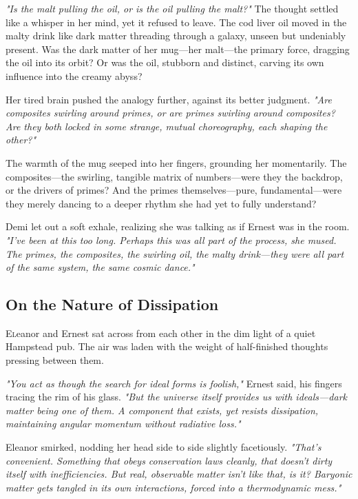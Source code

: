 \textit{"Is the malt pulling the oil, or is the oil pulling the malt?"} The thought settled like a whisper in her mind, yet it refused to leave. The cod liver oil moved in the malty drink like dark matter threading through a galaxy, unseen but undeniably present. Was the dark matter of her mug—her malt—the primary force, dragging the oil into its orbit? Or was the oil, stubborn and distinct, carving its own influence into the creamy abyss?

Her tired brain pushed the analogy further, against its better judgment. \textit{"Are composites swirling around primes, or are primes swirling around composites? Are they both locked in some strange, mutual choreography, each shaping the other?"}

The warmth of the mug seeped into her fingers, grounding her momentarily. The composites—the swirling, tangible matrix of numbers—were they the backdrop, or the drivers of primes? And the primes themselves—pure, fundamental—were they merely dancing to a deeper rhythm she had yet to fully understand?

Demi let out a soft exhale, realizing she was talking as if Ernest was in the room. \textit{"I’ve been at this too long.
Perhaps this was all part of the process, she mused. The primes, the composites, the swirling oil, the malty drink—they were all part of the same system, the same cosmic dance."}

\newpage
\subsection*{On the Nature of Dissipation}

\lettrine{E}leanor and Ernest sat across from each other in the dim light of a quiet Hampstead pub. The air was laden with the weight of half-finished thoughts pressing between them.

\smallskip

\textit{"You act as though the search for ideal forms is foolish,"} Ernest said, his fingers tracing the rim of his glass. \textit{"But the universe itself provides us with ideals—dark matter being one of them. A component that exists, yet resists dissipation, maintaining angular momentum without radiative loss."}

\smallskip


Eleanor smirked, nodding her head side to side slightly facetiously. \textit{"That’s convenient. Something that obeys conservation laws cleanly, that doesn’t dirty itself with inefficiencies. But real, observable matter isn’t like that, is it? Baryonic matter gets tangled in its own interactions, forced into a thermodynamic mess."}

